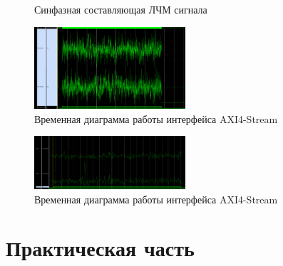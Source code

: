 \begin{figure}[h]
    \centering
    \noindent
    \caption{Синфазная составляющая ЛЧМ сигнала}
    \label{fig:chirp_i}
\end{figure}


\begin{figure}[h]
	\centering
	\includegraphics[width=0.5\textwidth]{image/lfm_with_noise.png}
	\caption{Временная диаграмма работы интерфейса AXI4-Stream}
	\label{fft_result}
\end{figure}
	
\begin{figure}[h]
	\centering
	\includegraphics[width=0.5\textwidth]{image/correl_with_noise.png}
	\caption{Временная диаграмма работы интерфейса AXI4-Stream}
	\label{fft_detailed_implem}
\end{figure}

\section{Практическая часть}


